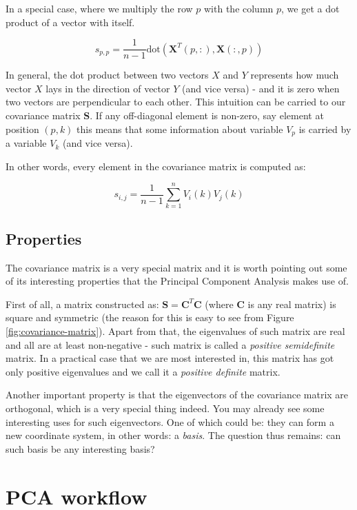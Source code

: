 \documentclass[10pt,twocolumn]{article}
\begin{document}
In a special case, where we multiply the row $p$ with the column $p$, we get a dot product of a vector with itself.

\begin{equation}
s_{p,p} = \frac{1}{n-1} \text{dot}( \bm{X}^T(p, :), \bm{X}(:,p))
\end{equation}

In general, the dot product between two vectors $X$ and $Y$ represents how much vector $X$ lays in the direction of vector $Y$ (and vice versa) - and it is zero when two vectors are perpendicular to each other. This intuition can be carried to our covariance matrix $\bm{S}$. If any off-diagonal element is non-zero, say element at position $(p,k)$ this means that some information about variable $V_p$ is carried by a variable $V_k$ (and vice versa).

In other words, every element in the covariance matrix is computed as:

\begin{equation}
s_{i,j} = \frac{1}{n-1} \sum\limits_{k=1}^n V_i(k) V_j(k)
\end{equation}

\subsection{Properties}

The covariance matrix is a very special matrix and it is worth pointing out some of its interesting properties that the Principal Component Analysis makes use of.

First of all, a matrix constructed as: $\bm{S} = \bm{C}^T \bm{C}$ (where $\bm{C}$ is any real matrix) is square and symmetric (the reason for this is easy to see from Figure \ref{fig:covariance-matrix}). Apart from that, the eigenvalues of such matrix are real and all are at least non-negative - such matrix is called a \textit{positive semidefinite} matrix. In a practical case that we are most interested in, this matrix has got only positive eigenvalues and we call it a \textit{positive definite} matrix.

Another important property is that the eigenvectors of the covariance matrix are orthogonal, which is a very special thing indeed. You may already see some interesting uses for such eigenvectors. One of which could be: they can form a new coordinate system, in other words: a \textit{basis}. The question thus remains: can such basis be any interesting basis?

\section{PCA workflow}
\end{document}
